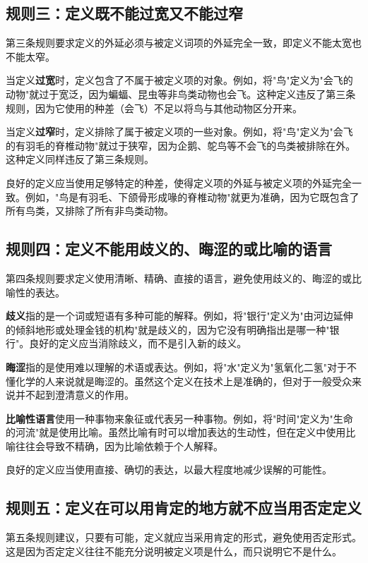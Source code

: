 \subsection{规则三：定义既不能过宽又不能过窄}

第三条规则要求定义的外延必须与被定义词项的外延完全一致，即定义不能太宽也不能太窄。

当定义\textbf{过宽}时，定义包含了不属于被定义项的对象。例如，将"鸟"定义为"会飞的动物"就过于宽泛，因为蝙蝠、昆虫等非鸟类动物也会飞。这种定义违反了第三条规则，因为它使用的种差（会飞）不足以将鸟与其他动物区分开来。

当定义\textbf{过窄}时，定义排除了属于被定义项的一些对象。例如，将"鸟"定义为"会飞的有羽毛的脊椎动物"就过于狭窄，因为企鹅、鸵鸟等不会飞的鸟类被排除在外。这种定义同样违反了第三条规则。

良好的定义应当使用足够特定的种差，使得定义项的外延与被定义项的外延完全一致。例如，"鸟是有羽毛、下颌骨形成喙的脊椎动物"就更为准确，因为它既包含了所有鸟类，又排除了所有非鸟类动物。

\subsection{规则四：定义不能用歧义的、晦涩的或比喻的语言}

第四条规则要求定义使用清晰、精确、直接的语言，避免使用歧义的、晦涩的或比喻性的表达。

\textbf{歧义}指的是一个词或短语有多种可能的解释。例如，将"银行"定义为"由河边延伸的倾斜地形或处理金钱的机构"就是歧义的，因为它没有明确指出是哪一种"银行"。良好的定义应当消除歧义，而不是引入新的歧义。

\textbf{晦涩}指的是使用难以理解的术语或表达。例如，将"水"定义为"氢氧化二氢"对于不懂化学的人来说就是晦涩的。虽然这个定义在技术上是准确的，但对于一般受众来说并不起到澄清意义的作用。

\textbf{比喻性语言}使用一种事物来象征或代表另一种事物。例如，将"时间"定义为"生命的河流"就是使用比喻。虽然比喻有时可以增加表达的生动性，但在定义中使用比喻往往会导致不精确，因为比喻依赖于个人解释。

良好的定义应当使用直接、确切的表达，以最大程度地减少误解的可能性。

\subsection{规则五：定义在可以用肯定的地方就不应当用否定定义}

第五条规则建议，只要有可能，定义就应当采用肯定的形式，避免使用否定形式。这是因为否定定义往往不能充分说明被定义项是什么，而只说明它不是什么。

